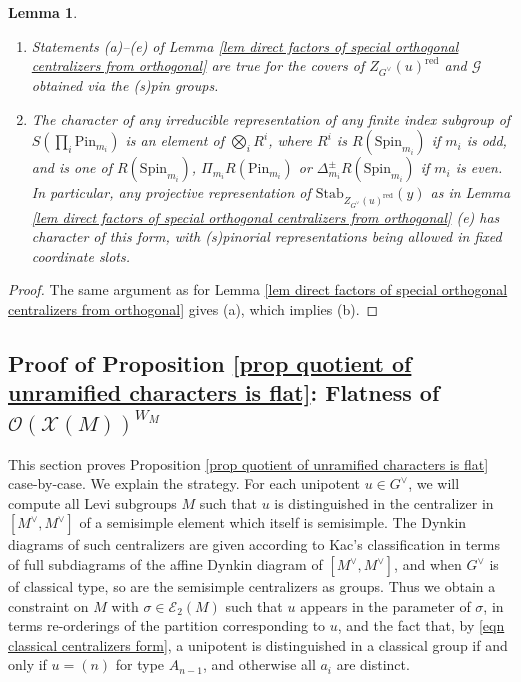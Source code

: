\documentclass[10pt]{article}
\newcommand{\stab}[2]{\mathrm{Stab}_{#1}(#2)}
\newcommand{\X}{\mathcal{X}}
\newcommand{\Ee}{\mathcal{E}}
\newcommand{\Oo}{\mathcal{O}}
\newcommand{\Spin}{\mathrm{Spin}}
\newtheorem{lem}{Lemma}
\theoremstyle{definition}
\theoremstyle{remark}
\newcommand{\Pin}{\mathrm{Pin}}
\newcommand{\Zur}{Z_{G^\vee}(u)^{\mathrm{red}}}
\newcommand{\Zz}{\mathcal{G}}
\begin{document}
\begin{lem}
\label{lem shape of characters of finite index Zur subgroups}
\begin{enumerate}
\item[(a)]
Statements (a)--(e) of Lemma \ref{lem direct factors of special orthogonal 
centralizers from orthogonal} are true for the covers of $\Zur$ and $\Zz$
obtained via the (s)pin groups.
%
\item[(b)]
The character of any irreducible representation of any finite index subgroup of $S(\prod_{i}\Pin_{m_i})$ is an 
element of $\bigotimes_i R^i$, where
$R^i$ is $R(\Spin_{m_i})$ if $m_i$ is odd, and is one of $R(\Spin_{m_i})$, 
$\Pi_{m_i}R(\Pin_{m_i})$ or $\Delta_{m_i}^\pm R(\Spin_{m_i})$ if $m_i$ is even. In particular,
any projective representation of $\stab{\Zur}{y}$ as in Lemma \ref{lem direct factors of special orthogonal centralizers from orthogonal} (e) has character of this form, with (s)pinorial representations being
allowed in fixed coordinate slots.
\end{enumerate}
%
\end{lem}
%
\begin{proof}
The same argument as for Lemma \ref{lem direct factors of special orthogonal centralizers from orthogonal} 
gives (a), which implies (b).
\end{proof}
%
\subsection{Proof of Proposition \ref{prop quotient of unramified characters is flat}: Flatness of $\Oo(\X(M))^{W_M}$}
\label{subsubsection flatness of O(X(M)/W)}
This section proves Proposition \ref{prop quotient of unramified characters is flat} case-by-case.
We explain the strategy. For each unipotent $u\in G^\vee$, we will 
compute all Levi subgroups $M$ such that $u$ is distinguished in the centralizer in $[M^\vee, M^\vee]$ of a 
semisimple element which itself is semisimple. The Dynkin diagrams of such centralizers are given according
to Kac's classification \cite[Ch.4, Section 4.8, Problem 61]{Kac} in terms of full subdiagrams of the affine Dynkin diagram of $[M^\vee, M^\vee]$,
and when $G^\vee$ is of classical type, so are the semisimple centralizers as groups.
Thus we obtain a constraint on $M$ with $\sigma\in\Ee_2(M)$ such that $u$ appears in the 
parameter of $\sigma$, in terms re-orderings of the partition corresponding to $u$, and the fact that, by
\eqref{eqn classical centralizers form}, a unipotent is distinguished in a classical group
if and only if $u=(n)$ for type $A_{n-1}$, and otherwise all $a_i$ are distinct.
\end{document}
